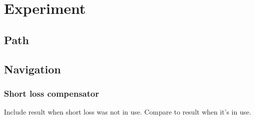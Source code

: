 \chapter{Experiment}
\section{Path}
\section{Navigation}
\subsection{Short loss compensator}
Include result when short loss was not in use. Compare to result when it's in use.